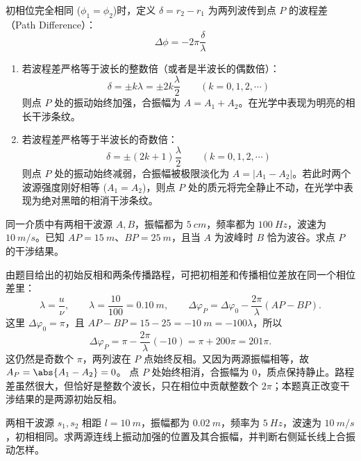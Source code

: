 \begin{definition}[波的干涉]
\begin{enumerate}
\end{enumerate}
初相位完全相同 ($\phi_1 = \phi_2$)时，定义 $\delta = r_2 - r_1$ 为两列波传到点 $P$ 的波程差（Path Difference）：$$\Delta\phi = -2\pi \frac{\delta}{\lambda}$$
 \begin{enumerate}
    \item 若波程差严格等于波长的整数倍（或者是半波长的偶数倍）：$$\boxed{\delta = \pm k\lambda = \pm 2k \frac{\lambda}{2} \qquad (k = 0,1,2,\cdots)}$$则点 $P$ 处的振动始终加强，合振幅为 $A = A_1 + A_2$。在光学中表现为明亮的相长干涉条纹。
    \item 若波程差严格等于半波长的奇数倍：$$\boxed{\delta = \pm (2k + 1)\frac{\lambda}{2} \qquad (k = 0,1,2,\cdots)}$$则点 $P$ 处的振动始终减弱，合振幅被极限淡化为 $A = |A_1 - A_2|$。若此时两个波源强度刚好相等 ($A_1 = A_2$)，则点 $P$ 处的质元将完全静止不动，在光学中表现为绝对黑暗的相消干涉条纹。
\end{enumerate}
\end{definition}

\begin{exercise}
同一介质中有两相干波源 \(A,B\)，振幅都为 \(\SI{5}{cm}\)，频率都为 \(\SI{100}{Hz}\)，波速为 \(\SI{10}{m/s}\)。已知 \(AP=\SI{15}{m}\)、\(BP=\SI{25}{m}\)，且当 \(A\) 为波峰时 \(B\) 恰为波谷。求点 \(P\) 的干涉结果。
\end{exercise}

\begin{solution}
由题目给出的初始反相和两条传播路程，可把初相差和传播相位差放在同一个相位差里：
\[
\lambda=\frac{u}{\nu},\qquad
\lambda=\frac{10}{100}=\SI{0.10}{m},\qquad
\Delta\varphi_P=\Delta\varphi_0-\frac{2\pi}{\lambda}(AP-BP).
\]
这里 \(\Delta\varphi_0=\pi\)，且 \(AP-BP=15-25=-\SI{10}{m}=-100\lambda\)，所以
\[
\Delta\varphi_P
=\pi-\frac{2\pi}{\lambda}(-10)
=\pi+200\pi
=201\pi.
\]
这仍然是奇数个 \(\pi\)，两列波在 \(P\) 点始终反相。又因为两源振幅相等，故 \(A_P=\abs{A_1-A_2}=0\)。
点 \(P\) 处始终相消，合振幅为 \(0\)，质点保持静止。路程差虽然很大，但恰好是整数个波长，只在相位中贡献整数个 \(2\pi\)；本题真正改变干涉结果的是两源初始反相。
\end{solution}

\begin{exercise}[两相干波源连线上哪些位置始终加强]
两相干波源 \(s_1,s_2\) 相距 \(l=\SI{10}{m}\)，振幅都为 \(\SI{0.02}{m}\)，频率为 \(\SI{5}{Hz}\)，波速为 \(\SI{10}{m/s}\)，初相相同。求两源连线上振动加强的位置及其合振幅，并判断右侧延长线上合振动怎样。
\end{exercise}


